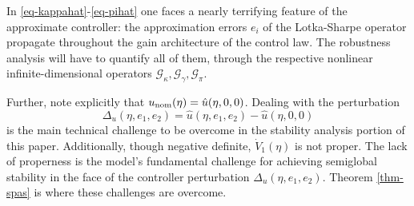 \documentclass[journal,twoside,web]{ieeecolor}
\begin{document}
In \eqref{eq-kappahat}-\eqref{eq-pihat} one faces a nearly terrifying feature of the approximate controller: the approximation errors $e_i$ of the Lotka-Sharpe operator propagate throughout the gain architecture of the control law. The robustness analysis will have to quantify all of them, through the respective nonlinear infinite-dimensional operators $\mathcal{G}_\kappa, \mathcal{G}_\gamma, \mathcal{G}_\pi$. 

Further, note explicitly that $u_{\rm nom}(\eta) = \hat u(\eta,0,0)$.
Dealing with the perturbation 
\begin{equation}
\Delta_u(\eta,e_1,e_2) = \hat u(\eta,e_1,e_2) - \hat u(\eta,0,0)
\end{equation}
 is the main technical challenge to be overcome in the stability analysis portion of this paper. Additionally, 
though negative definite, $\dot V_1(\eta)$ is not proper. The lack of properness is the model's fundamental challenge for achieving semiglobal stability in the face of the controller perturbation $\Delta_u(\eta,e_1,e_2)$. Theorem \ref{thm-spas} is where these challenges are overcome. 



\end{document}
